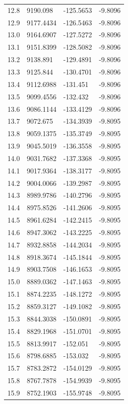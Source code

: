 \begin{table}[H]
\begin{tabular}{llll}
12.8 & 9190.098 & -125.5653 & -9.8096 \\
12.9 & 9177.4434 & -126.5463 & -9.8096 \\
13.0 & 9164.6907 & -127.5272 & -9.8096 \\
13.1 & 9151.8399 & -128.5082 & -9.8096 \\
13.2 & 9138.891 & -129.4891 & -9.8096 \\
13.3 & 9125.844 & -130.4701 & -9.8096 \\
13.4 & 9112.6988 & -131.451 & -9.8096 \\
13.5 & 9099.4556 & -132.432 & -9.8096 \\
13.6 & 9086.1144 & -133.4129 & -9.8096 \\
13.7 & 9072.675 & -134.3939 & -9.8095 \\
13.8 & 9059.1375 & -135.3749 & -9.8095 \\
13.9 & 9045.5019 & -136.3558 & -9.8095 \\
14.0 & 9031.7682 & -137.3368 & -9.8095 \\
14.1 & 9017.9364 & -138.3177 & -9.8095 \\
14.2 & 9004.0066 & -139.2987 & -9.8095 \\
14.3 & 8989.9786 & -140.2796 & -9.8095 \\
14.4 & 8975.8526 & -141.2606 & -9.8095 \\
14.5 & 8961.6284 & -142.2415 & -9.8095 \\
14.6 & 8947.3062 & -143.2225 & -9.8095 \\
14.7 & 8932.8858 & -144.2034 & -9.8095 \\
14.8 & 8918.3674 & -145.1844 & -9.8095 \\
14.9 & 8903.7508 & -146.1653 & -9.8095 \\
15.0 & 8889.0362 & -147.1463 & -9.8095 \\
15.1 & 8874.2235 & -148.1272 & -9.8095 \\
15.2 & 8859.3127 & -149.1082 & -9.8095 \\
15.3 & 8844.3038 & -150.0891 & -9.8095 \\
15.4 & 8829.1968 & -151.0701 & -9.8095 \\
15.5 & 8813.9917 & -152.051 & -9.8095 \\
15.6 & 8798.6885 & -153.032 & -9.8095 \\
15.7 & 8783.2872 & -154.0129 & -9.8095 \\
15.8 & 8767.7878 & -154.9939 & -9.8095 \\
15.9 & 8752.1903 & -155.9748 & -9.8095 \\

\end{tabular}
\end{table}
